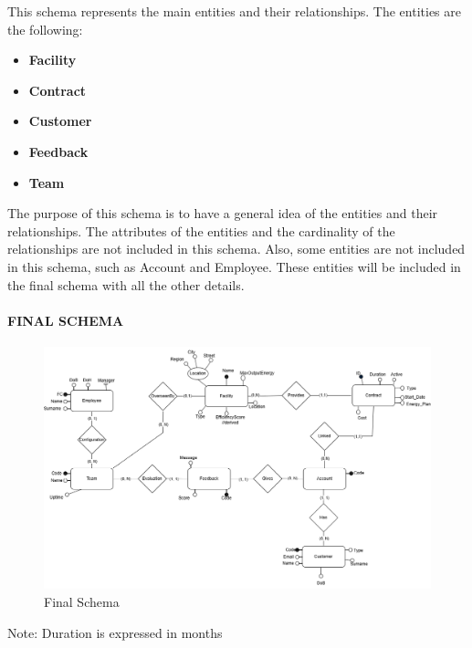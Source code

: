 \noindent This schema represents the main entities and their relationships. The entities are the following:
\begin{itemize}
    \item \textbf{Facility}
    \item \textbf{Contract}
    \item \textbf{Customer}
    \item \textbf{Feedback}
    \item \textbf{Team}
\end{itemize}
The purpose of this schema is to have a general idea of the entities and their relationships. The attributes of the entities and the cardinality of the relationships are not included in this schema. Also, some entities are not included in this schema, such as Account and Employee. These entities will be included in the final schema with all the other details.

\paragraph{FINAL SCHEMA} \leavevmode \newline

\begin{figure}[H]
    \centering
    \includegraphics[width=\textwidth]{images/ER.png}
    \caption{Final Schema}
\end{figure}

\noindent Note: Duration is expressed in months

